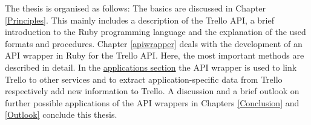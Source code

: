 The thesis is organised as follows: The basics are discussed in Chapter \ref{Principles}. This mainly includes a description of the Trello API, a brief introduction to the Ruby programming language and the explanation of the used formats and procedures. Chapter \ref{apiwrapper} deals with the development of an API wrapper in Ruby for the Trello API. Here, the most important methods are described in detail. In the \hyperref[applications]{applications section} the API wrapper is used to link Trello to other services and to extract application-specific data from Trello respectively add new information to Trello. A discussion and a brief outlook on further possible applications of the API wrappers in Chapters \ref{Conclusion} and \ref{Outlook} conclude this thesis.